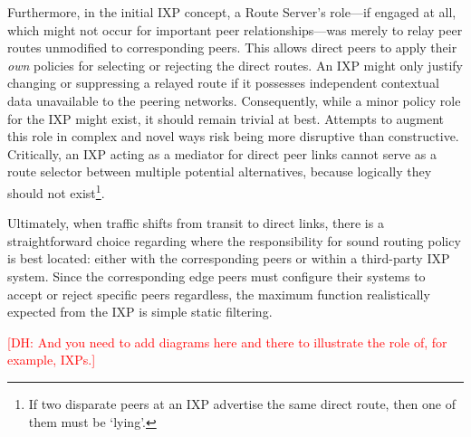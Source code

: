 Furthermore, in the initial IXP concept, a Route Server's role—if engaged at all, which might not occur for important peer relationships—was merely to relay peer routes unmodified to corresponding peers. This allows direct peers to apply their \textit{own} policies for selecting or rejecting the direct routes. An IXP might only justify changing or suppressing a relayed route if it possesses independent contextual data unavailable to the peering networks. Consequently, while a minor policy role for the IXP might exist, it should remain trivial at best. Attempts to augment this role in complex and novel ways risk being more disruptive than constructive. Critically, an IXP acting as a mediator for direct peer links cannot serve as a route selector between multiple potential alternatives, because logically they should not exist\footnote{If two disparate peers at an IXP advertise the same direct route, then one of them must be `lying'. }.

Ultimately, when traffic shifts from transit to direct links, there is a straightforward choice regarding where the responsibility for sound routing policy is best located: either with the corresponding peers or within a third-party IXP system. Since the corresponding edge peers must configure their systems to accept or reject specific peers regardless, the maximum function realistically expected from the IXP is simple static filtering.

\textcolor{red}{[DH: And you need to add diagrams here and there to illustrate the role of, for example, IXPs.]}


